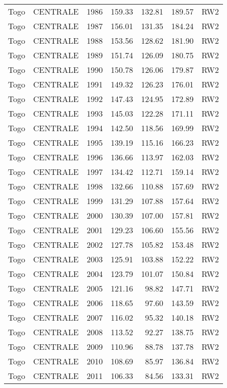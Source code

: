 \begin{longtable}{lllrrrl}
  Togo & CENTRALE & 1986 & 159.33 & 132.81 & 189.57 & RW2 \\ 
  Togo & CENTRALE & 1987 & 156.01 & 131.35 & 184.24 & RW2 \\ 
  Togo & CENTRALE & 1988 & 153.56 & 128.62 & 181.90 & RW2 \\ 
  Togo & CENTRALE & 1989 & 151.74 & 126.09 & 180.75 & RW2 \\ 
  Togo & CENTRALE & 1990 & 150.78 & 126.06 & 179.87 & RW2 \\ 
  Togo & CENTRALE & 1991 & 149.32 & 126.23 & 176.01 & RW2 \\ 
  Togo & CENTRALE & 1992 & 147.43 & 124.95 & 172.89 & RW2 \\ 
  Togo & CENTRALE & 1993 & 145.03 & 122.28 & 171.11 & RW2 \\ 
  Togo & CENTRALE & 1994 & 142.50 & 118.56 & 169.99 & RW2 \\ 
  Togo & CENTRALE & 1995 & 139.19 & 115.16 & 166.23 & RW2 \\ 
  Togo & CENTRALE & 1996 & 136.66 & 113.97 & 162.03 & RW2 \\ 
  Togo & CENTRALE & 1997 & 134.42 & 112.71 & 159.14 & RW2 \\ 
  Togo & CENTRALE & 1998 & 132.66 & 110.88 & 157.69 & RW2 \\ 
  Togo & CENTRALE & 1999 & 131.29 & 107.88 & 157.64 & RW2 \\ 
  Togo & CENTRALE & 2000 & 130.39 & 107.00 & 157.81 & RW2 \\ 
  Togo & CENTRALE & 2001 & 129.23 & 106.60 & 155.56 & RW2 \\ 
  Togo & CENTRALE & 2002 & 127.78 & 105.82 & 153.48 & RW2 \\ 
  Togo & CENTRALE & 2003 & 125.91 & 103.88 & 152.22 & RW2 \\ 
  Togo & CENTRALE & 2004 & 123.79 & 101.07 & 150.84 & RW2 \\ 
  Togo & CENTRALE & 2005 & 121.16 & 98.82 & 147.71 & RW2 \\ 
  Togo & CENTRALE & 2006 & 118.65 & 97.60 & 143.59 & RW2 \\ 
  Togo & CENTRALE & 2007 & 116.02 & 95.32 & 140.18 & RW2 \\ 
  Togo & CENTRALE & 2008 & 113.52 & 92.27 & 138.75 & RW2 \\ 
  Togo & CENTRALE & 2009 & 110.96 & 88.78 & 137.78 & RW2 \\ 
  Togo & CENTRALE & 2010 & 108.69 & 85.97 & 136.84 & RW2 \\ 
  Togo & CENTRALE & 2011 & 106.33 & 84.56 & 133.31 & RW2 \\ 

\end{longtable}

